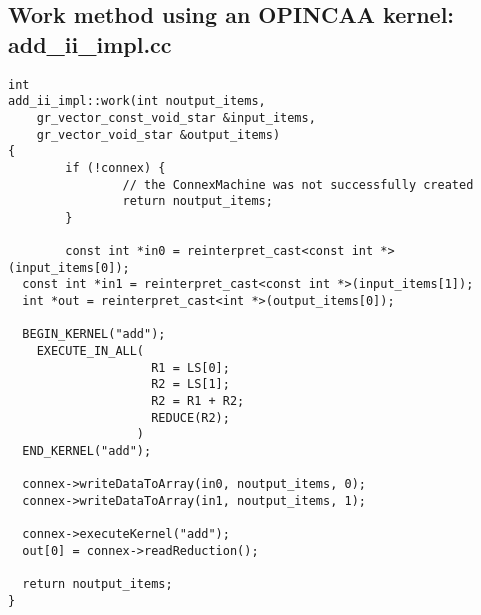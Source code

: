         \begin{minipage}{\linewidth}
        \subsection{Work method using an OPINCAA kernel: add\_ii\_impl.cc}
        \label{ssec:work-kernel}
                \begin{lstlisting}
int
add_ii_impl::work(int noutput_items,
    gr_vector_const_void_star &input_items,
    gr_vector_void_star &output_items)
{
        if (!connex) {
                // the ConnexMachine was not successfully created
                return noutput_items;
        }

        const int *in0 = reinterpret_cast<const int *>(input_items[0]);
  const int *in1 = reinterpret_cast<const int *>(input_items[1]);
  int *out = reinterpret_cast<int *>(output_items[0]);

  BEGIN_KERNEL("add");
    EXECUTE_IN_ALL(
                    R1 = LS[0];
                    R2 = LS[1];
                    R2 = R1 + R2;
                    REDUCE(R2);
                  )
  END_KERNEL("add");

  connex->writeDataToArray(in0, noutput_items, 0);
  connex->writeDataToArray(in1, noutput_items, 1);

  connex->executeKernel("add");
  out[0] = connex->readReduction();

  return noutput_items;
}
                \end{lstlisting}
                \end{minipage}

